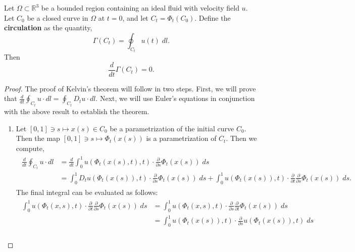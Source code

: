 \documentclass{article}
\begin{document}
\begin{theorem}[Kelvin]
	Let $\Omega\subset \mathbb{R}^{3}$ be a bounded region containing an ideal fluid with velocity field $u$. Let $C_{0}$ be a closed curve in $\Omega$ at $t = 0$, and let $C_{t} = \Phi_{t}(C_{0})$. Define the \textbf{circulation} as the quantity, 
	\begin{equation}
		\Gamma(C_{t}) = \oint_{C_{t}}u(t)\;dl. 
		\label{eq:circulation}
	\end{equation}
	Then 
	\begin{equation}
		\frac{d}{dt}\Gamma(C_{t}) = 0. 
		\label{eq:conservation_of_circulation} 
	\end{equation} 
\end{theorem}
\begin{proof}
	The proof of Kelvin's theorem will follow in two steps. First, we will prove that $\frac{d}{dt}\oint_{C_{t}}u \cdot dl = \oint_{C_{t}}D_{t}u\cdot dl$. Next, we will use Euler's equations in conjunction with the above result to establish the theorem. \vspace{-0.25cm} 
	\begin{enumerate}[itemsep =-2pt,label = (\arabic{*})]
		\item Let $[0,1] \ni s \mapsto x(s) \in C_{0}$ be a parametrization of the initial curve $C_{0}$. Then the map $[0,1] \ni s \mapsto \Phi_{t}(x(s))$ is a parametrization of $C_{t}$. Then we compute, 
		\begin{align*}
			\begin{split}
				\frac{d}{dt}\oint_{C_{t}}u\cdot dl &= \frac{d}{dt}\int_{0}^{1}u(\Phi_{t}(x(s),t),t) \cdot \frac{\partial}{\partial s}\Phi_{t}(x(s))\;ds \\
				&= \int_{0}^{1}D_{t}u(\Phi_{t}(x(s)),t)\cdot \frac{\partial}{\partial s}\Phi_{t}(x(s))\;ds + \int_{0}^{1}u(\Phi_{t}(x(s)), t) \cdot \frac{\partial}{\partial t}\frac{\partial}{\partial s}\Phi_{t}(x(s))\;ds. 
			\end{split}
		\end{align*}
		The final integral can be evaluated as follows: 
		\begin{align*}
			\begin{split}
				\int_{0}^{1}u(\Phi_{t}(x, s), t) \cdot \frac{\partial}{\partial t}\frac{\partial}{\partial s}\Phi_{t}(x(s))\;ds &= \int_{0}^{1}u(\Phi_{t}(x,s),t)\cdot \frac{\partial}{\partial s}\frac{\partial}{\partial t}\Phi_{t}(x(s))\;ds \\
				&= \int_{0}^{1}u(\Phi_{t}(x(s)), t) \cdot \frac{\partial}{\partial s}u(\Phi_{t}(x(s)), t)\;ds \\

\end{split}
\end{align*}
\end{enumerate}
\end{proof}
\end{document}
